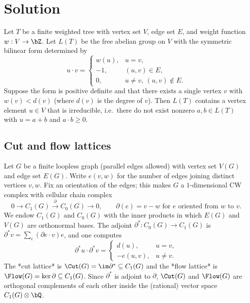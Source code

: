 \section*{Solution}


\begin{thm}\label{thm:main}
Let $T$ be a finite weighted tree with vertex set $V$, edge set $E$, and
weight function $w:V\to\bZ$. Let $L(T)$ be the free abelian group on $V$ with
the symmetric bilinear form determined by
\[
u\cdot v=\begin{cases} w(u),& u=v,\\ -1,& (u,v)\in E,\\ 0,& u\neq v,\ (u,v)\notin E.\end{cases}
\]
Suppose the form is positive definite and that there exists a single vertex $v$
with $w(v)<d(v)$ (where $d(v)$ is the degree of $v$). Then $L(T)$ contains a
vertex element $u\in V$ that is irreducible, i.e.\ there do not exist nonzero
$a,b\in L(T)$ with $u=a+b$ and $a\cdot b\geq 0$.
\end{thm}


\subsection*{Cut and flow lattices}


Let $G$ be a finite loopless graph (parallel edges allowed) with vertex set
$V(G)$ and edge set $E(G)$. Write $e(v,w)$ for the number of edges joining
distinct vertices $v,w$. Fix an orientation of the edges; this makes $G$ a
$1$-dimensional CW complex with cellular chain complex
\[
0\longrightarrow C_1(G)\xrightarrow{\ \partial\ } C_0(G)\longrightarrow 0,
\qquad \partial(e)=v-w \text{ for } e \text{ oriented from } w \text{ to } v.
\]
We endow $C_1(G)$ and $C_0(G)$ with the inner products in which $E(G)$ and
$V(G)$ are orthonormal bases. The adjoint $\partial^{*}:C_0(G)\to C_1(G)$ is
$\partial^{*}v=\sum_{e}(\partial e\cdot v)e$, and one computes
\begin{equation}\label{eq:cob}
\partial^{*}u\cdot \partial^{*}v=\begin{cases} d(u),& u=v,\\ -e(u,v),& u\neq v.\end{cases}
\end{equation}
The *cut lattice* is $\Cut(G)=\im\partial^{*}\subseteq C_1(G)$ and the *flow
lattice* is $\Flow(G)=\ker\partial\subseteq C_1(G)$. Since $\partial^{*}$ is
adjoint to $\partial$, $\Cut(G)$ and $\Flow(G)$ are orthogonal complements of
each other inside the (rational) vector space $C_1(G)\otimes\bQ$.

